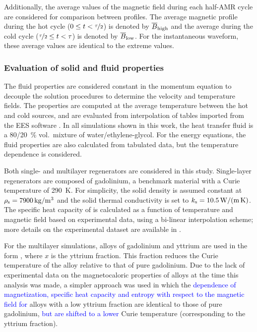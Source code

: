 \documentclass[referee]{svjour3}
\begin{document}

Additionally, the average values of the magnetic field during each half-AMR cycle are considered for comparison between profiles. The average magnetic profile during the hot cycle ($0 \le t < \nicefrac{\tau}{2}$) is denoted by $\overline{B}_{\mathrm{high}}$ and the average during the cold cycle  ($ \nicefrac{\tau}{2} \le t < \tau$) is denoted by $\overline{B}_{\mathrm{low}}$. For the instantaneous waveform, these average values are identical to the extreme values.


\subsubsection{Evaluation of solid and fluid properties}
\label{sec:eval-solid-fluid}

The fluid properties are considered constant in the momentum equation to decouple the solution procedures to determine the velocity and temperature fields. The properties are computed at the average temperature between the hot and cold sources, and are evaluated from interpolation of tables imported from the EES software \cite{bib:klein13-ees}. In all simulations shown in this work, the heat transfer fluid is a \num{80}/\SI{20}{\percent} vol.~mixture of water/ethylene-glycol. For the energy equations, the fluid properties are also calculated from tabulated data, but the temperature dependence is considered.


Both single- and multilayer regenerators are considered in this study. Single-layer regenerators are composed of gadolinium,  a benchmark material with a Curie temperature of \SI{290}{\kelvin}. For simplicity, the solid density is assumed constant at $\rho\ped{s} = \SI{7900}{\kg\per\cubic\meter}$ and the solid thermal conductivity is set to $k_{\mathrm{s}} = \SI{10.5}{\watt\per\meter\per\kelvin}$. The specific heat capacity of  is calculated as a function of temperature and magnetic field based on experimental data, using a bi-linear interpolation scheme; more details on the experimental dataset are available in \cite{bib:trevizoli16_perfor_model}. 

For the multilayer simulations, alloys of gadolinium and yttrium are used in the form , where $x$ is the yttrium fraction.  This fraction reduces the Curie temperature of the alloy relative to that of pure gadolinium. Due to the lack of experimental  data on the magnetocaloric properties of  alloys at the time this analysis was made, a simpler approach was used in which the \textcolor{blue}{dependence of magnetization, specific heat capacity and entropy with respect to the magnetic field for} alloys with a low yttrium fraction are identical to those of pure gadolinium, \textcolor{blue}{but are shifted to a lower} Curie temperature (corresponding to the yttrium fraction). 
\end{document}
